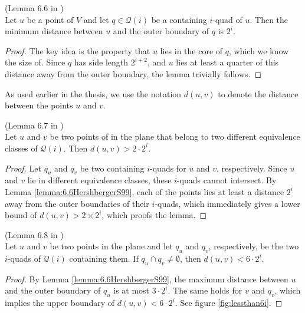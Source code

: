 \begin{Lemma} (Lemma 6.6 in \cite{HershbergerS99}) \label{lemma:6.6HershbergerS99}\\
Let $u$ be a point of $V$ and let $q \in \mathcal{Q}(i)$ be a containing $i$-quad of $u$. Then 
the minimum distance between $u$ and the outer boundary of $q$ is $2^i$.
\end{Lemma}

\begin{proof}
The key idea is the property that $u$ lies in the core of $q$, which we know the size of. Since 
$q$ has side length $2^{i+2}$, and $u$ lies at least a quarter of this distance away from the 
outer boundary, the lemma trivially follows.
\end{proof}

As used earlier in the thesis, we use the notation $d(u,v)$ to denote the distance between the 
points $u$ and $v$.

\begin{Lemma} (Lemma 6.7 in \cite{HershbergerS99}) \label{lemma:6.7HershbergerS99} \\
Let $u$ and $v$ be two points of in the plane that belong to two different equivalence classes of 
$\mathcal{Q}(i)$. Then $d(u,v) > 2 \cdot 2^i$.
\end{Lemma}

\begin{proof}
Let $q_u$ and $q_v$ be two containing $i$-quads for $u$ and $v$, respectively. Since $u$ and $v$ 
lie in different equivalence classes, these $i$-quads cannot intersect. By Lemma 
\ref{lemma:6.6HershbergerS99}, each of the points lies at least a distance $2^i$ away from 
the outer boundaries of their $i$-quads, which immediately gives a lower bound of $d(u,v) > 2 
\times 2^i$, which proofs the lemma.
\end{proof}

\begin{Lemma} (Lemma 6.8 in \cite{HershbergerS99}) \label{lemma:6.8HershbergerS99}\\
Let $u$ and $v$ be two points in the plane and let $q_u$ and $q_v$, respectively, be the two 
$i$-quads of $\mathcal{Q}(i)$ containing them. If $q_u \cap q_v \neq \emptyset$, then $d(u,v) < 6 
\cdot 2^i$.
\end{Lemma}

\begin{proof}
By Lemma \ref{lemma:6.6HershbergerS99}, the maximum distance between $u$ and the outer boundary 
of $q_u$ is at most $3 \cdot 2^i$. The same holds for $v$ and $q_v$, which implies the upper 
boundary of $d(u,v) < 6 \cdot 2^i$. See figure \ref{fig:lessthan6i}.
\end{proof}

